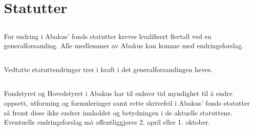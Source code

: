 \section{Statutter}

\subsection{}
For endring i Abakus’ fonds statutter kreves kvalifisert flertall ved en
generalforsamling. Alle medlemmer av Abakus kan komme med endringsforslag.

\subsection{}
Vedtatte statuttendringer trer i kraft i det generalforsamlingen heves.

\subsection{}
Fondstyret og Hovedstyret i Abakus har til enhver tid myndighet til å endre oppsett, utforming og formuleringer samt rette skrivefeil i Abakus' fonds statutter så fremt disse ikke endrer innholdet og betydningen i de aktuelle statuttene. Eventuelle endringsforslag må offentliggjøres 2. april eller 1. oktober.
